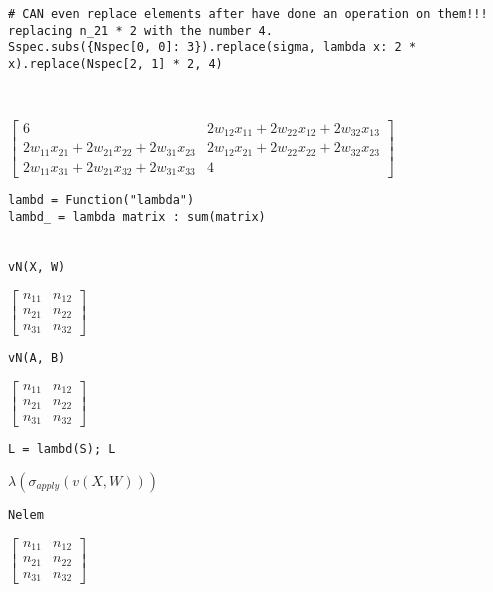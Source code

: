 \documentclass[
]{article}
\begin{document}
\begin{verbatim}
# CAN even replace elements after have done an operation on them!!! replacing n_21 * 2 with the number 4.
Sspec.subs({Nspec[0, 0]: 3}).replace(sigma, lambda x: 2 * x).replace(Nspec[2, 1] * 2, 4)



\end{verbatim}

\(\displaystyle \left[\begin{matrix}6 & 2 w_{12} x_{11} + 2 w_{22} x_{12} + 2 w_{32} x_{13}\\2 w_{11} x_{21} + 2 w_{21} x_{22} + 2 w_{31} x_{23} & 2 w_{12} x_{21} + 2 w_{22} x_{22} + 2 w_{32} x_{23}\\2 w_{11} x_{31} + 2 w_{21} x_{32} + 2 w_{31} x_{33} & 4\end{matrix}\right]\)

\begin{verbatim}
lambd = Function("lambda")
lambd_ = lambda matrix : sum(matrix)


vN(X, W)
\end{verbatim}

\(\displaystyle \left[\begin{matrix}n_{11} & n_{12}\\n_{21} & n_{22}\\n_{31} & n_{32}\end{matrix}\right]\)

\begin{verbatim}
vN(A, B)
\end{verbatim}

\(\displaystyle \left[\begin{matrix}n_{11} & n_{12}\\n_{21} & n_{22}\\n_{31} & n_{32}\end{matrix}\right]\)

\begin{verbatim}
L = lambd(S); L
\end{verbatim}

\(\displaystyle \lambda{\left(\sigma_{apply}{\left(v{\left(X,W \right)} \right)} \right)}\)

\begin{verbatim}
Nelem
\end{verbatim}

\(\displaystyle \left[\begin{matrix}n_{11} & n_{12}\\n_{21} & n_{22}\\n_{31} & n_{32}\end{matrix}\right]\)
\end{document}
